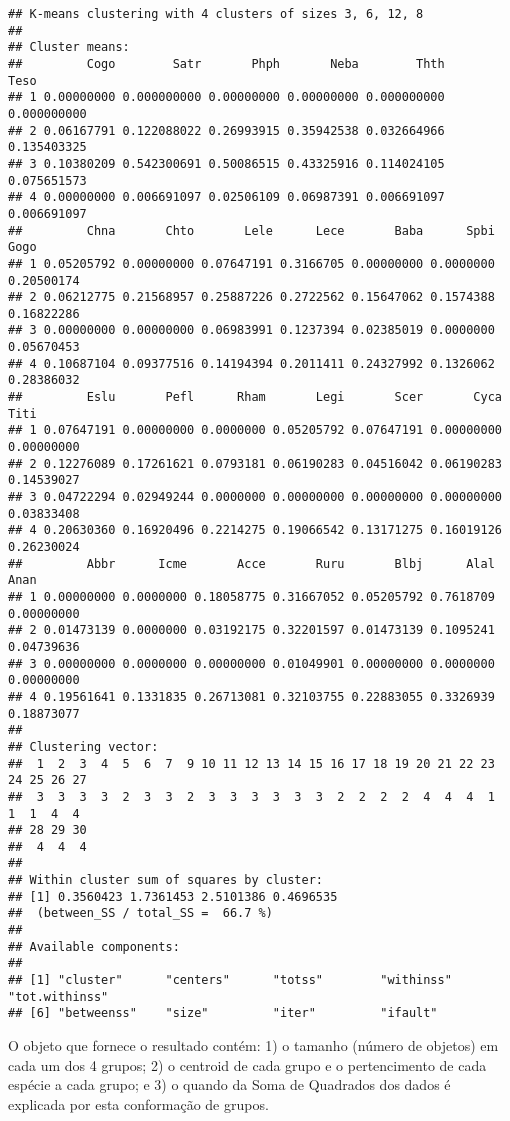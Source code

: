 \documentclass[
]{book}
\begin{document}
\begin{verbatim}
## K-means clustering with 4 clusters of sizes 3, 6, 12, 8
## 
## Cluster means:
##         Cogo        Satr       Phph       Neba        Thth        Teso
## 1 0.00000000 0.000000000 0.00000000 0.00000000 0.000000000 0.000000000
## 2 0.06167791 0.122088022 0.26993915 0.35942538 0.032664966 0.135403325
## 3 0.10380209 0.542300691 0.50086515 0.43325916 0.114024105 0.075651573
## 4 0.00000000 0.006691097 0.02506109 0.06987391 0.006691097 0.006691097
##         Chna       Chto       Lele      Lece       Baba      Spbi       Gogo
## 1 0.05205792 0.00000000 0.07647191 0.3166705 0.00000000 0.0000000 0.20500174
## 2 0.06212775 0.21568957 0.25887226 0.2722562 0.15647062 0.1574388 0.16822286
## 3 0.00000000 0.00000000 0.06983991 0.1237394 0.02385019 0.0000000 0.05670453
## 4 0.10687104 0.09377516 0.14194394 0.2011411 0.24327992 0.1326062 0.28386032
##         Eslu       Pefl      Rham       Legi       Scer       Cyca       Titi
## 1 0.07647191 0.00000000 0.0000000 0.05205792 0.07647191 0.00000000 0.00000000
## 2 0.12276089 0.17261621 0.0793181 0.06190283 0.04516042 0.06190283 0.14539027
## 3 0.04722294 0.02949244 0.0000000 0.00000000 0.00000000 0.00000000 0.03833408
## 4 0.20630360 0.16920496 0.2214275 0.19066542 0.13171275 0.16019126 0.26230024
##         Abbr      Icme       Acce       Ruru       Blbj      Alal       Anan
## 1 0.00000000 0.0000000 0.18058775 0.31667052 0.05205792 0.7618709 0.00000000
## 2 0.01473139 0.0000000 0.03192175 0.32201597 0.01473139 0.1095241 0.04739636
## 3 0.00000000 0.0000000 0.00000000 0.01049901 0.00000000 0.0000000 0.00000000
## 4 0.19561641 0.1331835 0.26713081 0.32103755 0.22883055 0.3326939 0.18873077
## 
## Clustering vector:
##  1  2  3  4  5  6  7  9 10 11 12 13 14 15 16 17 18 19 20 21 22 23 24 25 26 27 
##  3  3  3  3  2  3  3  2  3  3  3  3  3  3  2  2  2  2  4  4  4  1  1  1  4  4 
## 28 29 30 
##  4  4  4 
## 
## Within cluster sum of squares by cluster:
## [1] 0.3560423 1.7361453 2.5101386 0.4696535
##  (between_SS / total_SS =  66.7 %)
## 
## Available components:
## 
## [1] "cluster"      "centers"      "totss"        "withinss"     "tot.withinss"
## [6] "betweenss"    "size"         "iter"         "ifault"
\end{verbatim}

O objeto que fornece o resultado contém: 1) o tamanho (número de objetos) em cada um dos 4 grupos; 2) o centroid de cada grupo e o pertencimento de cada espécie a cada grupo; e 3) o quando da Soma de Quadrados dos dados é explicada por esta conformação de grupos.
\end{document}

